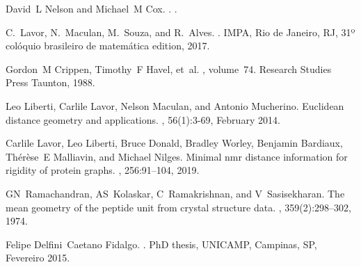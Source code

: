 \documentclass[portrait,final]{baposter}
\begin{document}
\begin{poster}
{			\renewcommand\refname{}
			
			
			\vspace{-0.6cm}
			\begin{thebibliography}{3}
				\begin{small}
					David~L Nelson and Michael~M Cox.
					.
					.
					\vspace{-0.3cm}
					
					C.~Lavor, N.~Maculan, M.~Souza, and R.~Alves.
					.
					\newblock IMPA, Rio de Janeiro, RJ, 31º colóquio brasileiro de matemática
					edition, 2017.
					\vspace{-0.3cm}
					
					Gordon~M Crippen, Timothy~F Havel, et~al.
					, volume~74.
					\newblock Research Studies Press Taunton, 1988.
					
					\vspace{-0.3cm}
					Leo Liberti, Carlile Lavor, Nelson Maculan, and Antonio Mucherino.
					\newblock Euclidean distance geometry and applications.
					, 56(1):3-69,
					February 2014.
					
					\vspace{-0.3cm}
					Carlile Lavor, Leo Liberti, Bruce Donald, Bradley Worley, Benjamin Bardiaux,
					Th{\'e}r{\`e}se~E Malliavin, and Michael Nilges.
					\newblock Minimal nmr distance information for rigidity of protein graphs.
					, 256:91--104, 2019.
					
					\vspace{-0.3cm}
					GN~Ramachandran, AS~Kolaskar, C~Ramakrishnan, and V~Sasisekharan.
					\newblock The mean geometry of the peptide unit from crystal structure data.
					,
					359(2):298--302, 1974.
					
					\vspace{-0.3cm}
					Felipe Delfini~Caetano Fidalgo.
					.
					\newblock PhD thesis, UNICAMP, Campinas, SP, Fevereiro 2015.
				\end{small}
				\vspace{-0.2cm}
		\end{thebibliography}}
		
		
		
		
	\end{poster}%
\end{document}
